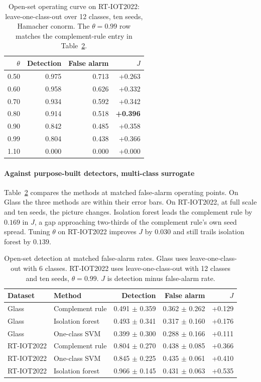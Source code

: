 \documentclass[journal]{IEEEtran}
\begin{document}
\begin{table}[t]
\centering
\caption{Open-set operating curve on RT-IOT2022: leave-one-class-out over 12 classes, ten seeds, Hamacher conorm. The $\theta = 0.99$ row matches the complement-rule entry in Table~\ref{tab:openset}.}
\label{tab:theta_rtiot}
\begin{tabular}{rrrr}
\toprule
$\theta$ & Detection & False alarm & $J$ \\
\midrule
0.50 & 0.975 & 0.713 & +0.263 \\
0.60 & 0.958 & 0.626 & +0.332 \\
0.70 & 0.934 & 0.592 & +0.342 \\
0.80 & 0.914 & 0.518 & \textbf{+0.396} \\
0.90 & 0.842 & 0.485 & +0.358 \\
0.99 & 0.804 & 0.438 & +0.366 \\
1.10 & 0.000 & 0.000 & +0.000 \\
\bottomrule
\end{tabular}
\end{table}

\paragraph{Against purpose-built detectors, multi-class surrogate}
Table~\ref{tab:openset} compares the methods at matched false-alarm operating points. On Glass the three methods are within their error bars. On RT-IOT2022, at full scale and ten seeds, the picture changes. Isolation forest leads the complement rule by $0.169$ in $J$, a gap approaching two-thirds of the complement rule's own seed spread. Tuning $\theta$ on RT-IOT2022 improves $J$ by $0.030$ and still trails isolation forest by $0.139$.

\begin{table}[t]
\centering
\caption{Open-set detection at matched false-alarm rates. Glass uses leave-one-class-out with 6 classes. RT-IOT2022 uses leave-one-class-out with 12 classes and ten seeds, $\theta = 0.99$. $J$ is detection minus false-alarm rate.}
\label{tab:openset}
\begin{tabular}{llrrr}
\toprule
Dataset & Method & Detection & False alarm & $J$ \\
\midrule
Glass & Complement rule & 0.491 $\pm$ 0.359 & 0.362 $\pm$ 0.262 & +0.129 \\
Glass & Isolation forest & 0.493 $\pm$ 0.341 & 0.317 $\pm$ 0.160 & +0.176 \\
Glass & One-class SVM & 0.399 $\pm$ 0.300 & 0.288 $\pm$ 0.166 & +0.111 \\
\midrule
RT-IOT2022 & Complement rule & 0.804 $\pm$ 0.270 & 0.438 $\pm$ 0.085 & +0.366 \\
RT-IOT2022 & One-class SVM & 0.845 $\pm$ 0.225 & 0.435 $\pm$ 0.061 & +0.410 \\
RT-IOT2022 & Isolation forest & 0.966 $\pm$ 0.145 & 0.431 $\pm$ 0.063 & +0.535 \\
\bottomrule
\end{tabular}
\end{table}
\end{document}
